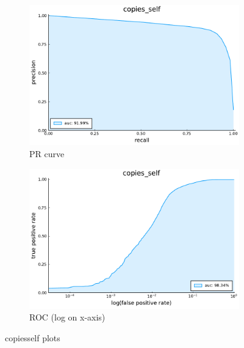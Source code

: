 \begin{figure}
    \centering
    \begin{subfigure}{.49\textwidth}
      \centering
      \includegraphics[width=1\linewidth]{pdfs/modperf/copies_self.bson-pr.pdf}
      \caption{PR curve}
    \end{subfigure}
    \begin{subfigure}{.49\textwidth}
        \centering
        \includegraphics[width=1\linewidth]{pdfs/modperf/copies_self.bson-roclog.pdf}
        \caption{ROC (log on x-axis)}
    \end{subfigure}
    \caption{copiesself plots}
    \label{fig:fig}
\end{figure}

